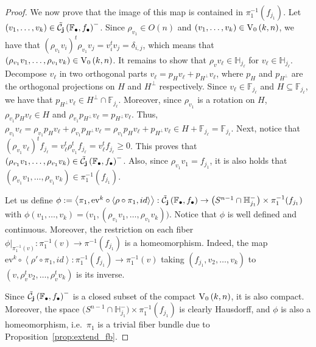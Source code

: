 \begin{proof}
We now prove that the image of this map is contained in $\pi_1^{-1}(f_{j_1})$. Let $(v_1,\ldots,v_k)\in\tilde{\mathcal{C}}_{\mathbf{j}}\left(\mathbb{F}_{\bullet},f_{\bullet}\right)^-$. Since $\rho_{v_1}\in O(n)$ and $(v_1,\ldots,v_k)\in\StO{k}{n}$, we have that $(\rho_{v_1}v_i)^t\rho_{v_1}v_j=v_i^tv_j=\delta_{i,j}$, which means that $(\rho_{v_1}v_1,\ldots,\rho_{v_1}v_k)\in\StO{k}{n}$. It remains to show that $\rho_vv_{\ell}\in\mathbb{H}_{j_{\ell}}$ for $v_{\ell}\in\mathbb{H}_{j_{\ell}}$. Decompose $v_{\ell}$ in two orthogonal parts $v_{\ell}=p_Hv_{\ell}+p_{H^{\perp}}v_{\ell}$, where $p_H$ and $p_{H^{\perp}}$ are the orthogonal projections on $H$ and $H^{\perp}$ respectively. Since $v_{\ell}\in\mathbb{F}_{j_{\ell}}$ and $H\subseteq\mathbb{F}_{j_{\ell}}$, we have that $p_{H^{\perp}}v_{\ell}\in H^{\perp}\cap\mathbb{F}_{j_{\ell}}$. Moreover, since $\rho_{v_1}$ is a rotation on $H$, $\rho_{v_1}p_Hv_{\ell}\in H$ and $\rho_{v_1}p_{H^{\perp}}v_{\ell}=p_{H^{\perp}}v_{\ell}$. Thus, $\rho_{v_1}v_{\ell}=\rho_{v_1}p_Hv_{\ell}+\rho_{v_1}p_{H^{\perp}}v_{\ell}=\rho_{v_1}p_Hv_{\ell}+p_{H^{\perp}}v_{\ell}\in H+\mathbb{F}_{j_{\ell}}=\mathbb{F}_{j_{\ell}}$. Next, notice that $(\rho_{v_1}v_{\ell})^tf_{j_{\ell}}=v_{\ell}^t\rho_{v_1}^tf_{j_{\ell}}=v_{\ell}^tf_{j_{\ell}}\geq0$. This proves that $(\rho_{v_1}v_1,\ldots,\rho_{v_1}v_k)\in\tilde{\mathcal{C}}_{\mathbf{j}}\left(\mathbb{F}_{\bullet},f_{\bullet}\right)^-$. Also, since $\rho_{v_1}v_1=f_{j_1}$, it is also holds that $(\rho_{v_1}v_1,\ldots,\rho_{v_1}v_k)\in\pi_1^{-1}(f_{j_1})$.

Let us define $\phi:=\left<\pi_1,\mathrm{ev}^k\circ\left<\rho\circ\pi_1,id\right>\right>:\tilde{\mathcal{C}}_{\mathbf{j}}\left(\mathbb{F}_{\bullet},f_{\bullet}\right)\to\big(S^{n-1}\cap\mathbb{H}_{j_1}^-\big)\times\pi_1^{-1}(f_{j_1})$ with $\phi(v_1,\ldots,v_k)=\big(v_1,(\rho_{v_1}v_1,\ldots,\rho_{v_1}v_k)\big)$. Notice that $\phi$ is well defined and continuous. Moreover, the restriction on each fiber $\phi|_{\pi_1^{-1}(v)}:\pi_1^{-1}(v)\to\pi^{-1}(f_{j_1})$ is a homeomorphism. Indeed, the map $\mathrm{ev}^k\circ\left<\rho'\circ\pi_1{,}id\right>:\pi_1^{-1}(f_{j_1})\to\pi_1^{-1}(v)$ taking $(f_{j_1},v_2,\ldots,v_k)$ to $(v,\rho_v^tv_2,\ldots,\rho_v^tv_k)$ is its inverse.

Since $\tilde{\mathcal{C}}_{\mathbf{j}}\left(\mathbb{F}_{\bullet},f_{\bullet}\right)^-$ is a closed subset of the compact $\StO{k}{n}$, it is also compact. Moreover, the space $\big(S^{n-1}\cap\mathbb{H}_{j_1}^-\big)\times\pi_1^{-1}(f_{j_1})$ is clearly Hausdorff, and $\phi$ is also a homeomorphism, i.e.\ $\pi_1$ is a trivial fiber bundle due to Proposition~\ref{prop:extend_fb}.
\end{proof}

